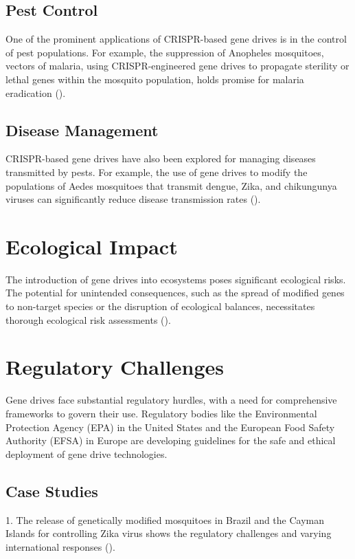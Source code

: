 \documentclass[12pt]{article}
\begin{document}
\subsection{Pest Control}
One of the prominent applications of CRISPR-based gene drives is in the control of pest populations. For example, the suppression of Anopheles mosquitoes, vectors of malaria, using CRISPR-engineered gene drives to propagate sterility or lethal genes within the mosquito population, holds promise for malaria eradication (\citealp{Gantz2015}).

\subsection{Disease Management}
CRISPR-based gene drives have also been explored for managing diseases transmitted by pests. For example, the use of gene drives to modify the populations of Aedes mosquitoes that transmit dengue, Zika, and chikungunya viruses can significantly reduce disease transmission rates (\citealp{Hammond2016}).

\section{Ecological Impact}
The introduction of gene drives into ecosystems poses significant ecological risks. The potential for unintended consequences, such as the spread of modified genes to non-target species or the disruption of ecological balances, necessitates thorough ecological risk assessments (\citealp{Esvelt2014}).

\section{Regulatory Challenges}
Gene drives face substantial regulatory hurdles, with a need for comprehensive frameworks to govern their use. Regulatory bodies like the Environmental Protection Agency (EPA) in the United States and the European Food Safety Authority (EFSA) in Europe are developing guidelines for the safe and ethical deployment of gene drive technologies.

\subsection{Case Studies}
1. The release of genetically modified mosquitoes in Brazil and the Cayman Islands for controlling Zika virus shows the regulatory challenges and varying international responses (\citealp{James2020}).
\end{document}
